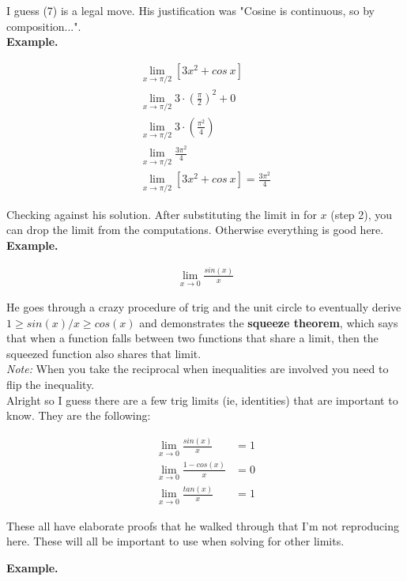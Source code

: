 \documentclass{article}
\begin{document}
I guess (7) is a legal move. His justification was "Cosine is continuous, so by
composition...".\\

\textbf{Example.}

\begin{align*}
    \lim_{x\to \pi/2} [3x^2 + cos~x]\\
    \lim_{x\to \pi/2} 3 \cdot \left( \frac{\pi}{2} \right)^2 + 0\\
    \lim_{x \to \pi/2} 3 \cdot \left( \frac{\pi^2}{4} \right)\\
    \lim_{x \to \pi/2} \frac{3\pi^2}{4}\\
    \lim_{x\to \pi/2} [3x^2 + cos~x] = \frac{3\pi^2}{4}
\end{align*}

Checking against his solution. After substituting the limit in for $x$ (step 2), you can
drop the limit from the computations. Otherwise everything is good here.\\

\textbf{Example.}

\begin{align*}
    \lim_{x\to 0} \frac{sin(x)}{x}
\end{align*}

He goes through a crazy procedure of trig and the unit circle to eventually derive $1 \geq
sin(x) / x \geq cos(x)$ and demonstrates the \textbf{squeeze theorem}, which says that
when a function falls between two functions that share a limit, then the squeezed function
also shares that limit. \\

\emph{Note:} When you take the reciprocal when inequalities are involved you need to flip
the inequality.\\

Alright so I guess there are a few trig limits (ie, identities) that are important to
know. They are the following:

\begin{align*}
    \lim_{x\to 0} \frac{sin(x)}{x} &= 1 \\
    \lim_{x\to 0} \frac{1 - cos(x)}{x} &= 0\\
    \lim_{x\to 0} \frac{tan(x)}{x} &= 1
\end{align*}

These all have elaborate proofs that he walked through that I'm not reproducing here. These will all be important to use when solving for other limits.

\textbf{Example.}
\end{document}
